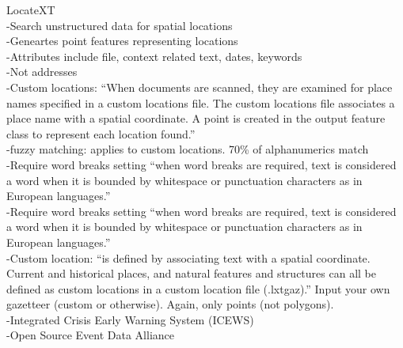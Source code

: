 LocateXT\\
-{\color{orange}Search unstructured data for spatial locations\cite{ArcGisLXT}}\\
-{\color{orange}Geneartes point features representing locations \cite{ArcGisLXT}}\\
-{\color{orange}Attributes include file, context related text, dates, keywords \cite{ArcGisLXT}}\\
-{\color{orange}Not addresses\cite{ArcGisLXT}}\\
-{\color{orange}Custom locations: “When documents are scanned, they are examined for place names specified in a custom locations file. The custom locations file associates a place name with a spatial coordinate. A point is created in the output feature class to represent each location found.”\cite{ArcGisLXT}}\\
-{\color{orange}fuzzy matching: applies to custom locations. 70\% of alphanumerics match\cite{ArcGisLXT}}\\
-{\color{orange}Require word breaks setting “when word breaks are required, text is considered a word when it is bounded by whitespace or punctuation characters as in European languages.”\cite{ArcGisLXT}}\\
-{\color{orange}Require word breaks setting “when word breaks are required, text is considered a word when it is bounded by whitespace or punctuation characters as in European languages.”\cite{ArcGisLXT}}\\
-{\color{orange}Custom location: “is defined by associating text with a spatial coordinate. Current and historical places, and natural features and structures can all be defined as custom locations in a custom location file (.lxtgaz).”\cite{ArcGisLXT}}{\color{purple} Input your own gazetteer (custom or otherwise). Again, only points (not polygons).}\\

-{Integrated Crisis Early Warning System (ICEWS)\cite{Lee2019}}\\
-{Open Source Event Data Alliance\cite{Lee2019}}\\

